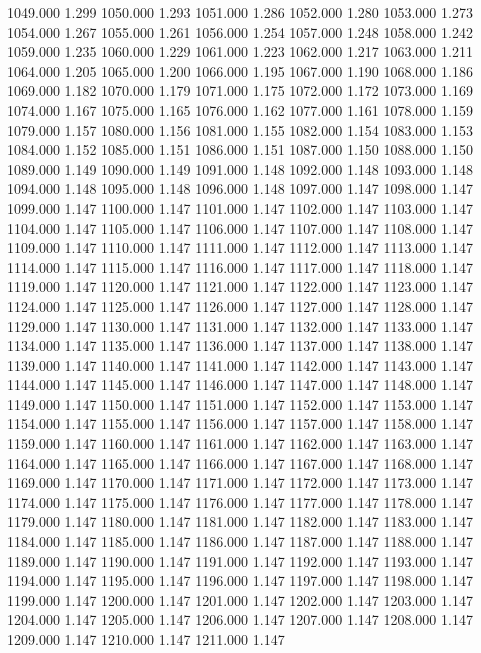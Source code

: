 1049.000 1.299 
1050.000 1.293 
1051.000 1.286 
1052.000 1.280 
1053.000 1.273 
1054.000 1.267 
1055.000 1.261 
1056.000 1.254 
1057.000 1.248 
1058.000 1.242 
1059.000 1.235 
1060.000 1.229 
1061.000 1.223 
1062.000 1.217 
1063.000 1.211 
1064.000 1.205 
1065.000 1.200 
1066.000 1.195 
1067.000 1.190 
1068.000 1.186 
1069.000 1.182 
1070.000 1.179 
1071.000 1.175 
1072.000 1.172 
1073.000 1.169 
1074.000 1.167 
1075.000 1.165 
1076.000 1.162 
1077.000 1.161 
1078.000 1.159 
1079.000 1.157 
1080.000 1.156 
1081.000 1.155 
1082.000 1.154 
1083.000 1.153 
1084.000 1.152 
1085.000 1.151 
1086.000 1.151 
1087.000 1.150 
1088.000 1.150 
1089.000 1.149 
1090.000 1.149 
1091.000 1.148 
1092.000 1.148 
1093.000 1.148 
1094.000 1.148 
1095.000 1.148 
1096.000 1.148 
1097.000 1.147 
1098.000 1.147 
1099.000 1.147 
1100.000 1.147 
1101.000 1.147 
1102.000 1.147 
1103.000 1.147 
1104.000 1.147 
1105.000 1.147 
1106.000 1.147 
1107.000 1.147 
1108.000 1.147 
1109.000 1.147 
1110.000 1.147 
1111.000 1.147 
1112.000 1.147 
1113.000 1.147 
1114.000 1.147 
1115.000 1.147 
1116.000 1.147 
1117.000 1.147 
1118.000 1.147 
1119.000 1.147 
1120.000 1.147 
1121.000 1.147 
1122.000 1.147 
1123.000 1.147 
1124.000 1.147 
1125.000 1.147 
1126.000 1.147 
1127.000 1.147 
1128.000 1.147 
1129.000 1.147 
1130.000 1.147 
1131.000 1.147 
1132.000 1.147 
1133.000 1.147 
1134.000 1.147 
1135.000 1.147 
1136.000 1.147 
1137.000 1.147 
1138.000 1.147 
1139.000 1.147 
1140.000 1.147 
1141.000 1.147 
1142.000 1.147 
1143.000 1.147 
1144.000 1.147 
1145.000 1.147 
1146.000 1.147 
1147.000 1.147 
1148.000 1.147 
1149.000 1.147 
1150.000 1.147 
1151.000 1.147 
1152.000 1.147 
1153.000 1.147 
1154.000 1.147 
1155.000 1.147 
1156.000 1.147 
1157.000 1.147 
1158.000 1.147 
1159.000 1.147 
1160.000 1.147 
1161.000 1.147 
1162.000 1.147 
1163.000 1.147 
1164.000 1.147 
1165.000 1.147 
1166.000 1.147 
1167.000 1.147 
1168.000 1.147 
1169.000 1.147 
1170.000 1.147 
1171.000 1.147 
1172.000 1.147 
1173.000 1.147 
1174.000 1.147 
1175.000 1.147 
1176.000 1.147 
1177.000 1.147 
1178.000 1.147 
1179.000 1.147 
1180.000 1.147 
1181.000 1.147 
1182.000 1.147 
1183.000 1.147 
1184.000 1.147 
1185.000 1.147 
1186.000 1.147 
1187.000 1.147 
1188.000 1.147 
1189.000 1.147 
1190.000 1.147 
1191.000 1.147 
1192.000 1.147 
1193.000 1.147 
1194.000 1.147 
1195.000 1.147 
1196.000 1.147 
1197.000 1.147 
1198.000 1.147 
1199.000 1.147 
1200.000 1.147 
1201.000 1.147 
1202.000 1.147 
1203.000 1.147 
1204.000 1.147 
1205.000 1.147 
1206.000 1.147 
1207.000 1.147 
1208.000 1.147 
1209.000 1.147 
1210.000 1.147 
1211.000 1.147 
